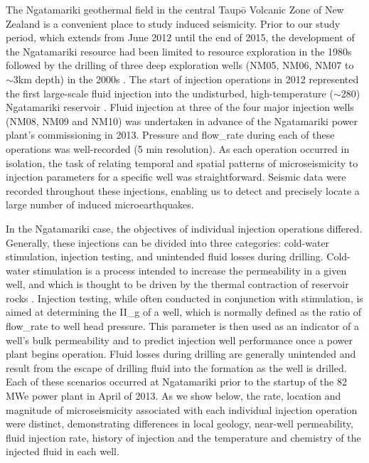The Ngatamariki geothermal field in the central Taup\={o} Volcanic Zone of New Zealand is a convenient place to study induced seismicity. Prior to our study period, which extends from June 2012 until the end of 2015, the development of the Ngatamariki resource had been limited to resource exploration in the 1980s followed by the drilling of three deep exploration wells (NM05, NM06, NM07 to $\sim$3km depth) in the 2000s \citep{Chambefort_2016}. The start of injection operations in 2012 represented the first large-scale fluid injection into the undisturbed, high-temperature ($\sim$280\textdegree) Ngatamariki reservoir \citep{Bignall_2009}. Fluid injection at three of the four major injection wells (NM08, NM09 and NM10) was undertaken in advance of the Ngatamariki power plant's commissioning in 2013. Pressure and \gls{flow_rate} during each of these operations was well-recorded (5 min resolution). As each operation occurred in isolation, the task of relating temporal and spatial patterns of microseismicity to injection parameters for a specific well was straightforward. Seismic data were recorded throughout these injections, enabling us to detect and precisely locate a large number of induced microearthquakes.

In the Ngatamariki case, the objectives of individual injection operations differed. Generally, these injections can be divided into three categories: cold-water \gls{stimulation}, injection testing, and unintended fluid losses during drilling. Cold-water \gls{stimulation} is a process intended to increase the \gls{permeability} in a given well, and which is thought to be driven by the thermal contraction of reservoir rocks \citep{grant2013thermal}. Injection testing, while often conducted in conjunction with \gls{stimulation}, is aimed at determining the \gls{II_g} of a well, which is normally defined as the ratio of \gls{flow_rate} to well head pressure. This parameter is then used as an indicator of a well's bulk \gls{permeability} and to predict injection well performance once a power plant begins operation. Fluid losses during drilling are generally unintended and result from the escape of drilling fluid into the formation as the well is drilled. Each of these scenarios occurred at Ngatamariki prior to the startup of the 82 \acrfull{MWe} power plant in April of 2013. As we show below, the rate, location and magnitude of microseismicity associated with each individual injection operation were distinct, demonstrating differences in local geology, near-well \gls{permeability}, fluid injection rate, history of injection and the temperature and chemistry of the injected fluid in each well.


